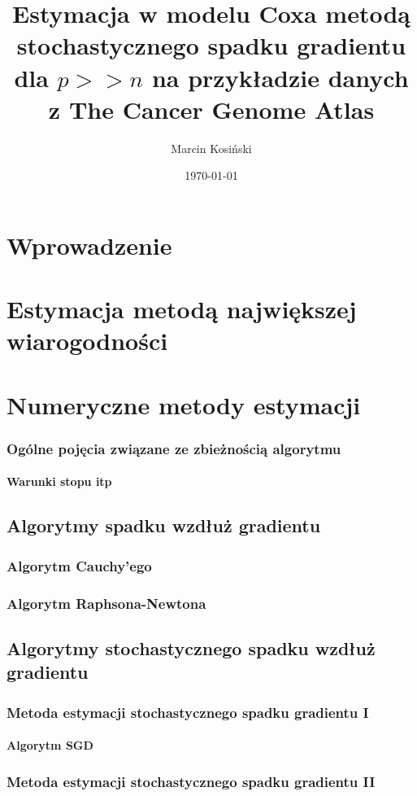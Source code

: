 \documentclass{mini}
\title{ Estymacja w modelu Coxa metodą stochastycznego spadku gradientu \newline dla $p >> n$ na przykładzie danych \newline z The Cancer Genome Atlas}
\author{Marcin Kosiński}
\date{\today}
\begin{document}
\maketitle
\tableofcontents

\chapter*{Wprowadzenie}


\chapter{Estymacja metodą największej wiarogodności}
\chapter{Numeryczne metody estymacji}
\subsection{Ogólne pojęcia związane ze zbieżnością algorytmu}
\subsubsection{Warunki stopu itp}
\section{Algorytmy spadku wzdłuż gradientu}
\subsection{Algorytm Cauchy'ego}
\subsection{Algorytm Raphsona-Newtona}
\section{Algorytmy stochastycznego spadku wzdłuż gradientu}
\subsection{Metoda estymacji stochastycznego spadku gradientu I}
\subsubsection{Algorytm SGD}
\subsection{Metoda estymacji stochastycznego spadku gradientu II}
\end{document}
